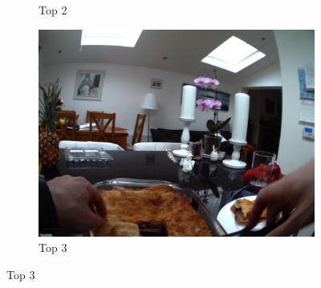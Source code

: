 \begin{figure}[H]
\begin{subfigure}{0.32\textwidth}
    \caption{Top 2}
  \end{subfigure}
  \begin{subfigure}{0.32\textwidth}
    \includegraphics[width=\textwidth]{Sections/7Results/images/top3.jpg}\hfill
    \caption{Top 3}
  \end{subfigure} \par\medskip


\end{figure}
